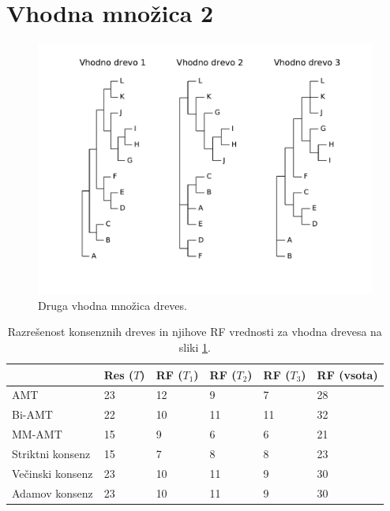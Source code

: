 \documentclass[a4paper, 12pt]{book}
\begin{document}
\section{Vhodna množica 2}
\begin{figure}[h!]
	\begin{center}
		\includegraphics[scale=0.50, clip=true, trim=1cm 2cm 1cm 0]{gfx/eval_input_2.pdf}
	\end{center}
	\caption{Druga vhodna množica dreves.}
	\label{img-eval-input-2}
\end{figure}

\begin{table}[h!]
	\begin{center}
	{\footnotesize
	\begin{tabular}{ l| l | l | l | l | l }
	~                & Res ($T$) & RF ($T_1$) & RF ($T_2$) & RF ($T_3$) & RF (vsota) \\ \hline
	AMT              & 23          & 12            & 9             & 7             & 28         \\ \hline
	Bi-AMT           & 22          & 10            & 11            & 11            & 32         \\ \hline
	MM-AMT           & 15          & 9             & 6             & 6             & 21         \\ \hline
	Striktni konsenz & 15          & 7             & 8             & 8             & 23         \\ \hline
	Večinski konsenz & 23          & 10            & 11            & 9             & 30         \\ \hline
	Adamov konsenz   & 23          & 10            & 11            & 9             & 30         \\ \hline
	\end{tabular}
	\caption{Razrešenost konsenznih dreves in njihove RF vrednosti za vhodna drevesa na sliki \ref{img-eval-input-2}.}
	}
	\label{table-eval-2}
	\end{center}		
\end{table}
\end{document}
